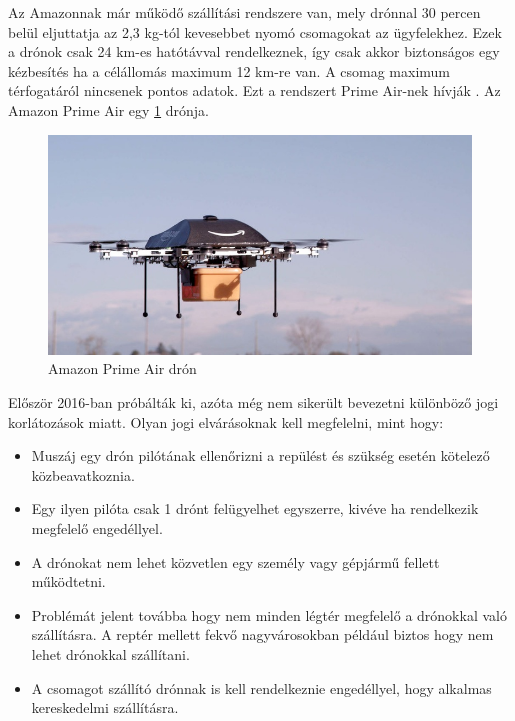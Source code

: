

Az Amazonnak már működő szállítási rendszere van, mely drónnal 30 percen belül eljuttatja az 2,3 kg-tól kevesebbet nyomó csomagokat az ügyfelekhez.
Ezek a drónok csak 24 km-es hatótávval rendelkeznek, így csak akkor biztonságos egy kézbesítés ha a célállomás maximum 12 km-re van.
A csomag maximum térfogatáról nincsenek pontos adatok.
Ezt a rendszert Prime Air-nek hívják \cite{prime-air}. Az Amazon Prime Air egy \ref{fig:prime} drónja.
\begin{figure}[h]
    \centering
    \includegraphics[scale=0.4]{images/prime.jpg}
    \caption{Amazon Prime Air drón}
    \label{fig:prime}
\end{figure}

Először 2016-ban próbálták ki, azóta még nem sikerült bevezetni különböző jogi korlátozások miatt. Olyan jogi elvárásoknak kell megfelelni, mint hogy:
\begin{itemize}
    \item Muszáj egy drón pilótának ellenőrizni a repülést és szükség esetén kötelező közbeavatkoznia.
    \item Egy ilyen pilóta csak 1 drónt felügyelhet egyszerre, kivéve ha rendelkezik megfelelő engedéllyel.
    \item A drónokat nem lehet közvetlen egy személy vagy gépjármű fellett működtetni.
    \item Problémát jelent továbba hogy nem minden légtér megfelelő a drónokkal való szállításra. A reptér mellett fekvő nagyvárosokban például biztos hogy nem lehet drónokkal szállítani.
    \item A csomagot szállító drónnak is kell rendelkeznie engedéllyel, hogy alkalmas kereskedelmi szállításra.
\end{itemize}

